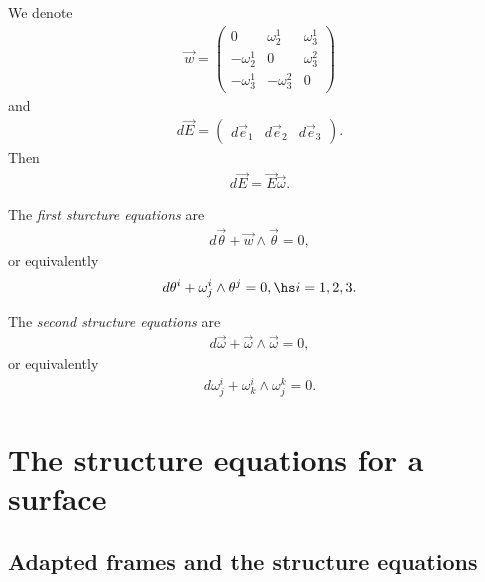 \documentclass{article}
\begin{document}
\begin{lemma}
    We denote 
    \begin{align*}
        \vec w = \begin{pmatrix}
            0           & \omega_2^1  & \omega_3^1 \\
            -\omega_2^1 & 0           & \omega_3^2 \\
            -\omega_3^1 & -\omega_3^2 & 0
        \end{pmatrix}
    \end{align*}
    and 
    \begin{align*}
        d\vec E = \begin{pmatrix}
            d\vec e_1 & d\vec e_2 & d\vec e_3
        \end{pmatrix}.
    \end{align*}
    Then 
    \begin{align*}
        d\vec E = \vec E\vec\omega.
    \end{align*}
\end{lemma}

\begin{theorem}
    The \emph{first sturcture equations} are 
    \begin{align*}
        d\vec\theta + \vec w \wedge \vec \theta = 0,
    \end{align*}
    or equivalently 
    \begin{align*}
        d\theta^i + \omega_j^i \wedge \theta^j = 0,\hs i=1,2,3.
    \end{align*}
\end{theorem}

\begin{theorem}
    The \emph{second structure equations} are 
    \begin{align*}
        d\vec\omega + \vec \omega \wedge\vec \omega = 0,
    \end{align*}
    or equivalently 
    \begin{align*}
        d\omega_j^i + \omega_k^i\wedge\omega_j^k=0.
    \end{align*}
\end{theorem}

\section{The structure equations for a surface}

\subsection{Adapted frames and the structure equations}
\end{document}
